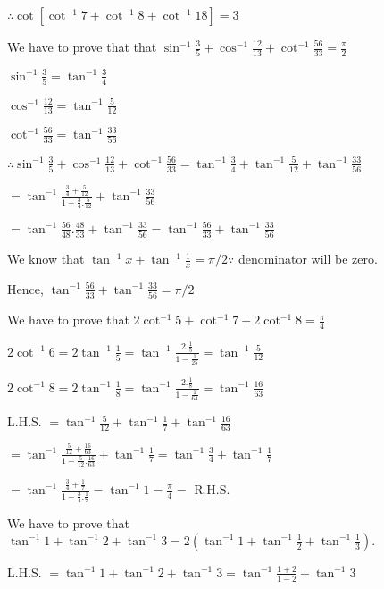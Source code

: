   $\therefore \cot[\cot^{-1}7 + \cot^{-1}8 + \cot^{-1}18] = 3$

\item We have to prove that that $\sin^{-1}\frac{3}{5} + \cos^{-1}\frac{12}{13} + \cot^{-1}\frac{56}{33} = \frac{\pi}{2}$

  $\sin^{-1}\frac{3}{5} = \tan^{-1}\frac{3}{4}$

  $\cos^{-1}\frac{12}{13} = \tan^{-1}\frac{5}{12}$

  $\cot^{-1}\frac{56}{33} = \tan^{-1}\frac{33}{56}$

  $\therefore \sin^{-1}\frac{3}{5} + \cos^{-1}\frac{12}{13} + \cot^{-1}\frac{56}{33} = \tan^{-1}\frac{3}{4} +
  \tan^{-1}\frac{5}{12} + \tan^{-1}\frac{33}{56}$

  $= \tan^{-1}\frac{\frac{3}{4} + \frac{5}{12}}{1 - \frac{3}{4}.\frac{5}{12}} + \tan^{-1}\frac{33}{56}$

  $= \tan^{-1}\frac{56}{48}.\frac{48}{33} + \tan^{-1}\frac{33}{56} = \tan^{-1}\frac{56}{33} + \tan^{-1}\frac{33}{56}$

  We know that $\tan^{-1}x + \tan^{-1}\frac{1}{x} = \pi/2 \because$ denominator will be zero.

  Hence, $\tan^{-1}\frac{56}{33} + \tan^{-1}\frac{33}{56} = \pi/2$

\item We have to prove that $2\cot^{-1}5 + \cot^{-1}7 + 2\cot^{-1}8 = \frac{\pi}{4}$

  $2\cot^{-1}6 = 2\tan^{-1}\frac{1}{5} = \tan^{-1}\frac{2.\frac{1}{5}}{1 - \frac{1}{25}} = \tan^{-1}\frac{5}{12}$

  $2\cot^{-1}8 = 2\tan^{-1}\frac{1}{8} = \tan^{-1}\frac{2.\frac{1}{8}}{1 - \frac{1}{64}} = \tan^{-1}\frac{16}{63}$

  L.H.S. $= \tan^{-1}\frac{5}{12} + \tan^{-1}\frac{1}{7} + \tan^{-1}\frac{16}{63}$

  $= \tan^{-1}\frac{\frac{5}{12} + \frac{16}{63}}{1 - \frac{5}{12}.\frac{16}{63}} + \tan^{-1}\frac{1}{7} =
  \tan^{-1}\frac{3}{4} + \tan^{-1}\frac{1}{7}$

  $= \tan^{-1}\frac{\frac{3}{4} + \frac{1}{7}}{1 - \frac{3}{4}.\frac{1}{7}} =
  \tan^{-1}1 = \frac{\pi}{4} =$ R.H.S.

\item We have to prove that $\tan^{-1}1 + \tan^{-1}2 + \tan^{-1}3 = 2\left(\tan^{-1}1 + \tan^{-1}\frac{1}{2} +
  \tan^{-1}\frac{1}{3}\right).$

  L.H.S. $= \tan^{-1}1 + \tan^{-1}2 + \tan^{-1}3 = \tan^{-1}\frac{1 + 2}{1 - 2} + \tan^{-1}3$

